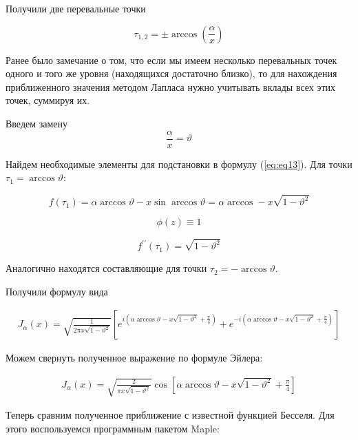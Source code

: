 \documentclass[14pt]{extarticle}
\begin{document}
Получили две перевальные точки

\begin{equation}\nonumber
\tau_{1,2} = \pm \arccos\left(\frac{\alpha}{x}\right)
\end{equation} 

Ранее было замечание о том, что если мы имеем несколько перевальных точек одного и того же уровня (находящихся достаточно близко), то для нахождения приближенного значения методом Лапласа нужно учитывать вклады всех этих точек, суммируя их.

Введем замену 
\begin{equation}\nonumber
\frac{\alpha}{x} = \vartheta
\end{equation}

Найдем необходимые элементы для подстановки в формулу (\ref{eq:eq13}). Для точки $\tau_1 = \arccos\vartheta$:

\begin{equation}\nonumber
f(\tau_1) = \alpha \arccos\vartheta - x \sin \arccos\vartheta = \alpha \arccos - x \sqrt{1-\vartheta^2}
\end{equation}

\begin{equation}\nonumber
\phi(z) \equiv 1
\end{equation}

\begin{equation}\nonumber
f^{\prime \prime} (\tau_1) = \sqrt{1-\vartheta^2}
\end{equation}

Аналогично находятся составляющие для точки $\tau_2 = -\arccos\vartheta$.

Получили формулу вида

\begin{eqnarray}\nonumber
J_\alpha(x) = \sqrt{\frac{1}{2 \pi x \sqrt{1-\vartheta^2}}} \left[ e^{i(\alpha \arccos 
	\vartheta - x \sqrt{1 - \vartheta^2} + \frac{\pi}{4})}  + e^{-i(\alpha \arccos 
	\vartheta - x \sqrt{1 - \vartheta^2} + \frac{\pi}{4})} \right]
\end{eqnarray}

Можем свернуть полученное выражение по формуле Эйлера:

\begin{eqnarray}\nonumber
J_\alpha(x) = \sqrt{\frac{2}{\pi x \sqrt{1-\vartheta^2}}} \cos \left[\alpha \arccos 
	\vartheta - x \sqrt{1 - \vartheta^2} + \frac{\pi}{4}\right]
\end{eqnarray}

Теперь сравним полученное приближение с известной функцией Бесселя. Для этого воспользуемся программным пакетом Maple:
\end{document}
